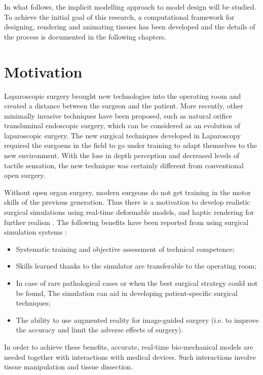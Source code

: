 In what follows, the implicit modelling approach to model design will be studied. To achieve the initial goal of this research, a
computational framework for designing, rendering and animating tissues has been developed and the details of the process is documented 
in the following chapters. 


\section{Motivation}

Laparoscopic surgery brought new technologies into the operating room and created a 
distance between the surgeon and the patient. More recently, other minimally invasive techniques have 
been proposed, such as natural orifice transluminal endoscopic surgery, which can be considered as an 
evolution of laparoscopic surgery. The new surgical techniques developed in Laparoscopy
required the surgoens in the field to go under training to adapt themselves to the new environment.
With the loss in depth perception and decreased levels of tactile sensation, the new technique was
certainly different from conventional open surgery.

Without open organ surgery, modern surgeons do not get training in the motor skills of the 
previous generation. Thus there is a motivation to develop realistic surgical simulations using 
real-time deformable models, and haptic rendering for further realism \cite{Lin2004}. 
The following benefits have been reported from using surgical simulation systems 
\cite{Liu2003, Basdogan2004}: 

\begin{itemize}
 \item Systematic training and objective assessment of technical competence;
 \item Skills learned thanks to the simulator are transferable to the operating room;
 \item In case of rare pathological cases or when the best surgical strategy could not be found, 
 The simulation can aid in developing patient-specific surgical techniques;
 \item The ability to use augmented reality for image-guided surgery (i.e. to improve the accuracy and 
 limit the adverse effects of surgery).
\end{itemize}

In order to achieve these benefits, accurate, real-time bio-mechanical models are needed together
with interactions with medical devices. Such interactions involve tissue manipulation and tissue dissection. 

